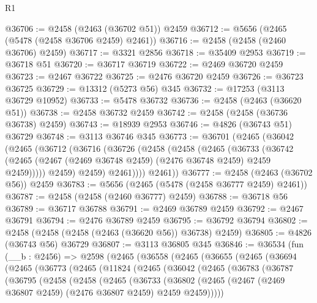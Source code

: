 \begin{lexlean}{R1}
\begin{coremodule}
@36706 := @2458 (@2463 (@36702 @51)) @2459
@36712 := @5656 (@2465 (@5478 (@2458 @36706 @2459) @2461))
@36716 := @2458 (@2458 (@2460 @36706) @2459)
@36717 := @3321 @2856
@36718 := @35409 @2953
@36719 := @36718 @51
@36720 := @36717 @36719
@36722 := @2469 @36720 @2459
@36723 := @2467 @36722
@36725 := @2476 @36720 @2459
@36726 := @36723 @36725
@36729 := @13312 (@5273 @56) @345
@36732 := @17253 (@3113 @36729 @10952)
@36733 := @5478 @36732
@36736 := @2458 (@2463 (@36620 @51))
@36738 := @2458 @36732 @2459
@36742 := @2458 (@2458 (@36736 @36738) @2459)
@36743 := @18939 @2953
@36746 := @4826 (@36743 @51) @36729
@36748 := @3113 @36746 @345
@36773 := @36701
    (@2465
      (@36042
        (@2465
          (@36712
            (@36716
              (@36726
                (@2458
                  (@2458
                    (@2465
                      (@36733
                        (@36742
                          (@2465 (@2467 (@2469 @36748 @2459) (@2476 @36748 @2459) @2459 @2459)))))
                    @2459)
                  @2459)
                @2461))))
        @2461))
@36777 := @2458 (@2463 (@36702 @56)) @2459
@36783 := @5656 (@2465 (@5478 (@2458 @36777 @2459) @2461))
@36787 := @2458 (@2458 (@2460 @36777) @2459)
@36788 := @36718 @56
@36789 := @36717 @36788
@36791 := @2469 @36789 @2459
@36792 := @2467 @36791
@36794 := @2476 @36789 @2459
@36795 := @36792 @36794
@36802 := @2458 (@2458 (@2458 (@2463 (@36620 @56)) @36738) @2459)
@36805 := @4826 (@36743 @56) @36729
@36807 := @3113 @36805 @345
@36846 := @36534
    (fun (__b : @2456) =>
    @2598
      (@2465
        (@36558
          (@2465
            (@36655
              (@2465
                (@36694
                  (@2465
                    (@36773
                      (@2465
                        (@11824
                          (@2465
                            (@36042
                              (@2465
                                (@36783
                                  (@36787
                                    (@36795
                                      (@2458
                                        (@2458
                                          (@2465
                                            (@36733
                                              (@36802
                                                (@2465
                                                  (@2467
                                                    (@2469 @36807 @2459)
                                                    (@2476 @36807 @2459)
                                                    @2459
                                                    @2459)))))

\end{coremodule}
\end{lexlean}
